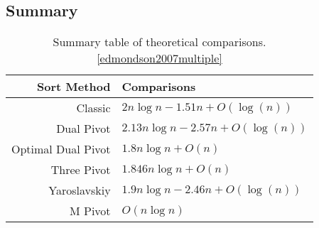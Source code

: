 	\subsection{Summary}
		\begin{table}
			\begin{center}
				\begin{tabular}{|r|l|}
					\hline
					Sort Method        &   Comparisons                          \\ \hline \hline
					Classic            &   $2n \log n - 1.51n  + O(\log(n))$    \\ \hline
					Dual Pivot         &   $2.13n \log n - 2.57n + O(\log(n))$  \\ \hline
					Optimal Dual Pivot &   $1.8n \log n + O(n)$                 \\ \hline
					Three Pivot        &   $1.846n \log n + O(n)$               \\ \hline
					Yaroslavskiy       &   $1.9n \log n - 2.46n + O(\log(n))$   \\ \hline
					M Pivot            &   $O(n \log n)$                        \\ \hline
				\end{tabular}
				\caption{Summary table of theoretical comparisons.\ref{edmondson2007multiple}\cite{kushagra2013multi}\cite{Aumuller:2013:OPD:2525857.2525862}\cite{Wild:2012:ACA:2404160.2404231}}
				\label{tab:CompSummary}
			\end{center}
		\end{table}

